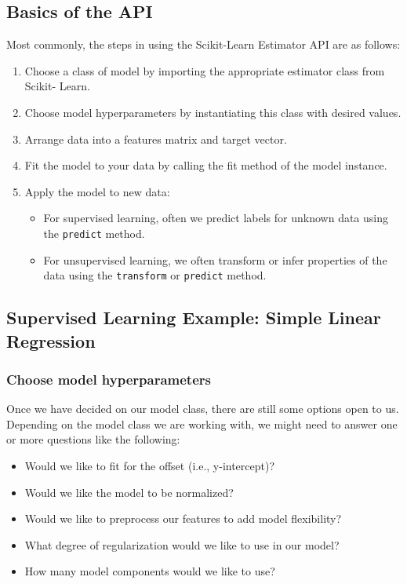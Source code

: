 \subsection*{Basics of the API}
Most commonly, the steps in using the Scikit-Learn Estimator API are as follows:
\begin{enumerate}
    \item Choose a class of model by importing the appropriate estimator class from Scikit-
          Learn.
    \item Choose model hyperparameters by instantiating this class with desired values.
    \item Arrange data into a features matrix and target vector.
    \item Fit the model to your data by calling the fit method of the model instance.
    \item Apply the model to new data:
          \begin{itemize}
              \item For supervised learning, often we predict labels for unknown data using the
                    \verb|predict| method.
              \item For unsupervised learning, we often transform or infer properties of the data
                    using the \verb|transform| or \verb|predict| method.
          \end{itemize}
\end{enumerate}

\subsection*{Supervised Learning Example: Simple Linear Regression}
\subsubsection*{Choose model hyperparameters}

Once we have decided on our model class, there are still some options open to us.
Depending on the model class we are working with, we might need to answer one or
more questions like the following:

\begin{itemize}
    \item Would we like to fit for the offset (i.e., y-intercept)?
    \item Would we like the model to be normalized?
    \item Would we like to preprocess our features to add model flexibility?
    \item What degree of regularization would we like to use in our model?
    \item How many model components would we like to use?
\end{itemize}

